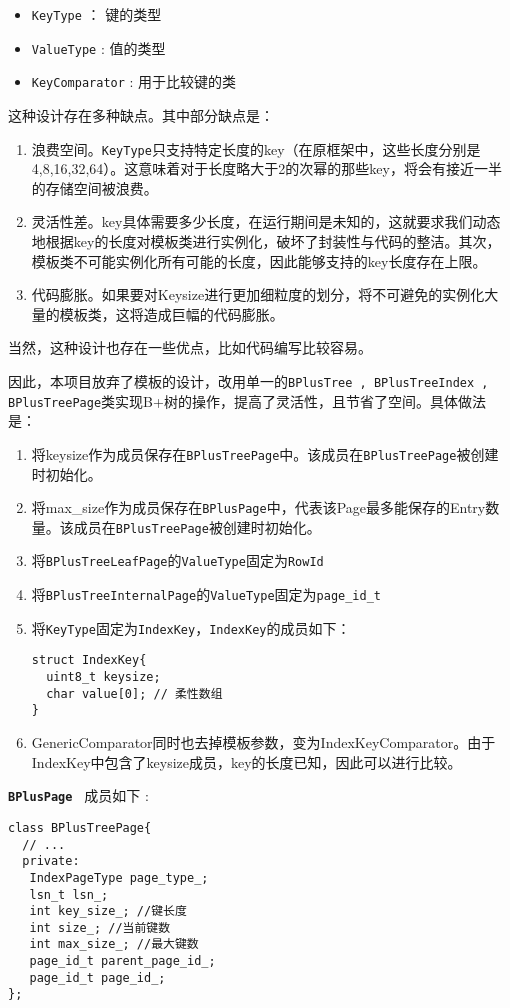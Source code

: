 \documentclass[12pt, a4paper]{article}
\def\c#1{\texttt{#1}}
\def\b#1{\textbf{#1}}
\def\bc#1{\b{\c{#1}}}
\def\pid{page\_id\_t\ }
\def\p{\par}
\begin{document}
\begin{itemize}
  \item \c{KeyType} ： 键的类型
  \item \c{ValueType} : 值的类型
  \item \c{KeyComparator} : 用于比较键的类
\end{itemize}
\p 这种设计存在多种缺点。其中部分缺点是：
\begin{enumerate}
  \item 浪费空间。\c{KeyType}只支持特定长度的key（在原框架中，这些长度分别是4,8,16,32,64）。这意味着对于长度略大于2的次幂的那些key，将会有接近一半的存储空间被浪费。
  \item 灵活性差。key具体需要多少长度，在运行期间是未知的，这就要求我们动态地根据key的长度对模板类进行实例化，破坏了封装性与代码的整洁。其次，模板类不可能实例化所有可能的长度，因此能够支持的key长度存在上限。
  \item 代码膨胀。如果要对Keysize进行更加细粒度的划分，将不可避免的实例化大量的模板类，这将造成巨幅的代码膨胀。
\end{enumerate}
\p 当然，这种设计也存在一些优点，比如代码编写比较容易。
\p 因此，本项目放弃了模板的设计，改用单一的\c{BPlusTree , BPlusTreeIndex , BPlusTreePage}类实现B+树的操作，提高了灵活性，且节省了空间。具体做法是：
\begin{enumerate}
  \item 将keysize作为成员保存在\c{BPlusTreePage}中。该成员在\c{BPlusTreePage}被创建时初始化。
  \item 将max\_size作为成员保存在\c{BPlusPage}中，代表该Page最多能保存的Entry数量。该成员在\c{BPlusTreePage}被创建时初始化。
  \item 将\c{BPlusTreeLeafPage}的\c{ValueType}固定为\c{RowId}
  \item 将\c{BPlusTreeInternalPage}的\c{ValueType}固定为\c{\pid}
  \item 将\c{KeyType}固定为\c{IndexKey}，\c{IndexKey}的成员如下：\begin{lstlisting}[style=customc]
struct IndexKey{
  uint8_t keysize;
  char value[0]; // 柔性数组
}
  \end{lstlisting}
  \item GenericComparator同时也去掉模板参数，变为IndexKeyComparator。由于IndexKey中包含了keysize成员，key的长度已知，因此可以进行比较。
\end{enumerate}
\p \bc{BPlusPage } 成员如下 :\begin{lstlisting}[style=customc]
class BPlusTreePage{
  // ... 
  private:
   IndexPageType page_type_;
   lsn_t lsn_;
   int key_size_; //键长度
   int size_; //当前键数
   int max_size_; //最大键数
   page_id_t parent_page_id_;
   page_id_t page_id_;
};

\end{lstlisting}
\end{document}
